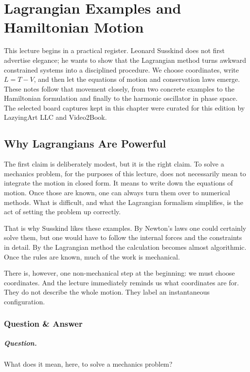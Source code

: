 \chapter{Lagrangian Examples and Hamiltonian Motion}

This lecture begins in a practical register. Leonard Susskind does not first advertise elegance; he wants to show that the Lagrangian method turns awkward constrained systems into a disciplined procedure. We choose coordinates, write \(L=T-V\), and then let the equations of motion and conservation laws emerge. These notes follow that movement closely, from two concrete examples to the Hamiltonian formulation and finally to the harmonic oscillator in phase space. The selected board captures kept in this chapter were curated for this edition by LazyingArt LLC and Video2Book.

\section{Why Lagrangians Are Powerful}

The first claim is deliberately modest, but it is the right claim. To solve a mechanics problem, for the purposes of this lecture, does not necessarily mean to integrate the motion in closed form. It means to write down the equations of motion. Once those are known, one can always turn them over to numerical methods. What is difficult, and what the Lagrangian formalism simplifies, is the act of setting the problem up correctly.

That is why Susskind likes these examples. By Newton's laws one could certainly solve them, but one would have to follow the internal forces and the constraints in detail. By the Lagrangian method the calculation becomes almost algorithmic. Once the rules are known, much of the work is mechanical.

There is, however, one non-mechanical step at the beginning: we must choose coordinates. And the lecture immediately reminds us what coordinates are for. They do not describe the whole motion. They label an instantaneous configuration.

\subsection{Question \& Answer}

\paragraph{Question.} What does it mean, here, to solve a mechanics problem?


